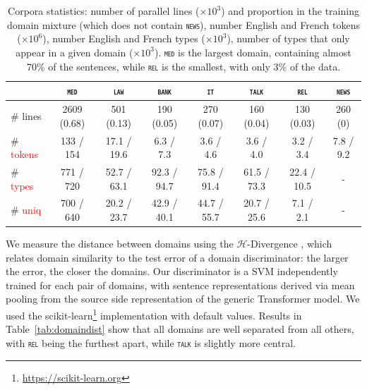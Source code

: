 \documentclass[11pt,a4paper]{article}
\newcommand{\fyTodo}[1]{\Todo[FY:]{\textcolor{orange}{#1}}}
\newcommand{\fyDone}[1]{\done[FY]\Todo[FY:]{\textcolor{orange}{#1}}}
\newcommand{\revision}[1]{\textcolor{red}{#1}}
\newcommand{\domain}[1]{\texttt{\textsc{#1}}}
\begin{document}
\begin{table}[htbp]
  \centering
  \begin{tabular}{|l|ccccccc|} %
    \cline{2-8} 
    \multicolumn{1}{c|}{} & \multicolumn{1}{c}{\domain{med}} & \multicolumn{1}{c}{\domain{law}} & \multicolumn{1}{c}{\domain{bank}} & \multicolumn{1}{c}{\domain{it}} & \multicolumn{1}{c}{\domain{talk}} & \multicolumn{1}{c}{\domain{rel}} & \multicolumn{1}{c|}{\domain{news}} \\
    \hline 
    \# lines & 2609 (0.68) & 501 (0.13) & 190 (0.05) & 270 (0.07) & 160 (0.04) & 130 (0.03) & 260 (0) \\
    \# \revision{tokens}  &  133 / 154  &  17.1 / 19.6 &  6.3 / 7.3 &  3.6 / 4.6 &  3.6 / 4.0 &  3.2 / 3.4 & 7.8 / 9.2   \\
    \# \revision{types}  & 771 / 720 & 52.7 / 63.1 & 92.3 / 94.7 & 75.8 / 91.4 & 61.5 / 73.3 & 22.4 / 10.5 & - \\
    \# \revision{uniq} & 700 / 640 & 20.2 / 23.7 & 42.9 / 40.1 & 44.7 / 55.7 & 20.7 / 25.6 & 7.1 / 2.1 & - \\
    \hline
  \end{tabular}
  \caption{Corpora statistics: number of parallel lines ($\times 10^3$) and proportion in the training domain mixture (which does not contain \domain{news}), number English and French tokens ($\times 10^6$), number English and French types ($\times 10^3$), number of types that only appear in a given domain ($\times 10^3$). \domain{med} is the largest domain, containing almost 70\% of the sentences, while \domain{rel} is the smallest, with only 3\% of the data.
  }
\label{tab:Corpora}
\end{table}

\fyTodo{Keep this ?}
We measure the distance between domains using the $\mathcal{H}$-Divergence \cite{Ben-David09atheory}, which relates domain similarity to the test error of a domain discriminator: the larger the error, the closer the domains.
Our discriminator is a SVM independently trained for each pair of domains, with sentence representations derived via mean pooling from the source side representation of the generic Transformer model. We used the scikit-learn\footnote{\url{https://scikit-learn.org}} implementation with default values.\fyDone{Inform the classifier details}\fyDone{Insert tableau} Results in Table~\ref{tab:domaindist} show that all domains are well separated from all others, with \domain{rel} being the furthest apart, while \domain{talk} is slightly more central.
\end{document}
